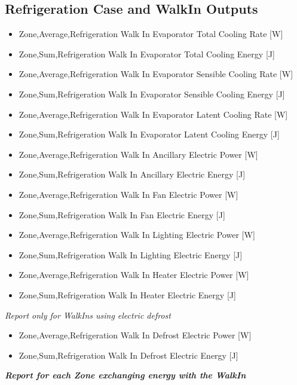 \subsection{Refrigeration Case and WalkIn Outputs}\label{refrigeration-case-and-walkin-outputs}

\begin{itemize}
\item
  Zone,Average,Refrigeration Walk In Evaporator Total Cooling Rate {[}W{]}
\item
  Zone,Sum,Refrigeration Walk In Evaporator Total Cooling Energy {[}J{]}
\item
  Zone,Average,Refrigeration Walk In Evaporator Sensible Cooling Rate {[}W{]}
\item
  Zone,Sum,Refrigeration Walk In Evaporator Sensible Cooling Energy {[}J{]}
\item
  Zone,Average,Refrigeration Walk In Evaporator Latent Cooling Rate {[}W{]}
\item
  Zone,Sum,Refrigeration Walk In Evaporator Latent Cooling Energy {[}J{]}
\item
  Zone,Average,Refrigeration Walk In Ancillary Electric Power {[}W{]}
\item
  Zone,Sum,Refrigeration Walk In Ancillary Electric Energy {[}J{]}
\item
  Zone,Average,Refrigeration Walk In Fan Electric Power {[}W{]}
\item
  Zone,Sum,Refrigeration Walk In Fan Electric Energy {[}J{]}
\item
  Zone,Average,Refrigeration Walk In Lighting Electric Power {[}W{]}
\item
  Zone,Sum,Refrigeration Walk In Lighting Electric Energy {[}J{]}
\item
  Zone,Average,Refrigeration Walk In Heater Electric Power {[}W{]}
\item
  Zone,Sum,Refrigeration Walk In Heater Electric Energy {[}J{]}
\end{itemize}

\emph{Report only for WalkIns using electric defrost}

\begin{itemize}
\item
  Zone,Average,Refrigeration Walk In Defrost Electric Power {[}W{]}
\item
  Zone,Sum,Refrigeration Walk In Defrost Electric Energy {[}J{]}
\end{itemize}

\textbf{\emph{Report for each Zone exchanging energy with the WalkIn}}

